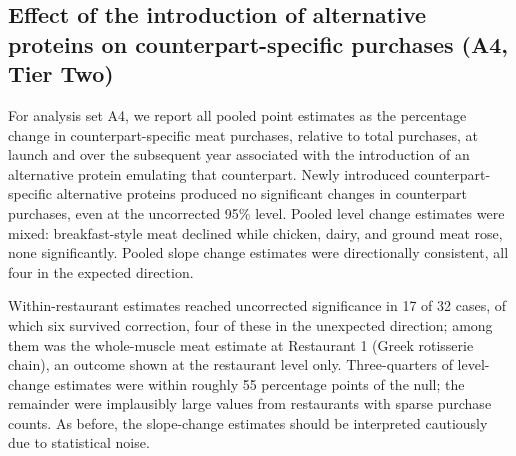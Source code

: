 \subsection{Effect of the introduction of alternative proteins on counterpart-specific purchases (A4, Tier Two)}

For analysis set A4, we report all pooled point estimates as the percentage change in counterpart-specific meat purchases, relative to total purchases, at launch and over the subsequent year associated with the introduction of an alternative protein emulating that counterpart. Newly introduced counterpart-specific alternative proteins produced no significant changes in counterpart purchases, even at the uncorrected 95\% level. Pooled level change estimates were mixed: breakfast-style meat declined while chicken, dairy, and ground meat rose, none significantly. Pooled slope change estimates were directionally consistent, all four in the expected direction.

Within-restaurant estimates reached uncorrected significance in 17 of 32 cases, of which six survived correction, four of these in the unexpected direction; among them was the whole-muscle meat estimate at Restaurant 1 (Greek rotisserie chain), an outcome shown at the restaurant level only. Three-quarters of level-change estimates were within roughly 55 percentage points of the null; the remainder were implausibly large values from restaurants with sparse purchase counts. As before, the slope-change estimates should be interpreted cautiously due to statistical noise.

